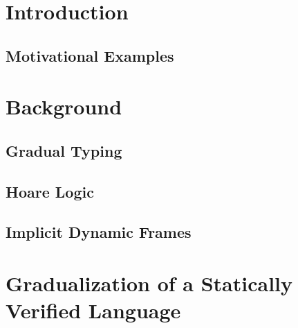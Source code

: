 
\chapter{Introduction}
\label{ch:introduction}


    \section{Motivational Examples}
    \label{sec:motivationexamples}
    



\chapter{Background}
\label{sec:categorization-of-existing}


\section{Gradual Typing}
\label{ssec:abstracting-gradual-typing}


\section{Hoare Logic}
\label{sec:hoare-logic}


\section{Implicit Dynamic Frames}
\label{ssec:implicit-dynamic-frames}





\chapter{Gradualization of a Statically Verified Language}
\label{ch:gradualization-of-a}


